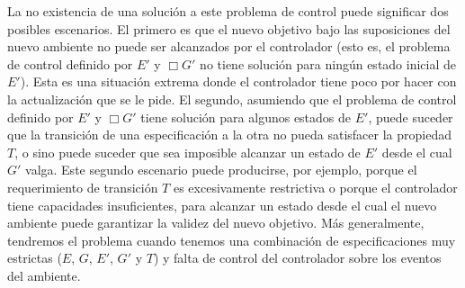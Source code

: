 La no existencia de una solución a este problema de control puede significar dos posibles escenarios. El primero es que
el nuevo objetivo bajo las suposiciones del nuevo ambiente no puede ser alcanzados por el controlador (esto es, el
problema de control definido por $E'$ y $\Box G'$ no tiene solución para ningún estado inicial de $E'$). Esta es una
situación extrema donde el controlador tiene poco por hacer con la actualización que se le pide. El segundo, asumiendo
que el problema de control definido por $E'$ y $\Box G'$ tiene solución para algunos estados de $E'$, puede suceder que la
transición de una especificación a la otra no pueda satisfacer la propiedad $T$, o sino puede suceder que sea
imposible alcanzar un estado de $E'$ desde el cual $G'$ valga. Este segundo escenario puede producirse, por ejemplo,
porque el requerimiento de transición $T$ es excesivamente restrictiva o porque el controlador tiene capacidades
insuficientes, para alcanzar un estado desde el cual el nuevo ambiente puede garantizar la validez del nuevo
objetivo. Más generalmente, tendremos el problema cuando tenemos una combinación de especificaciones muy estrictas ($E$,
$G$, $E'$, $G'$ y $T$) y falta de control del controlador sobre los eventos del ambiente.
